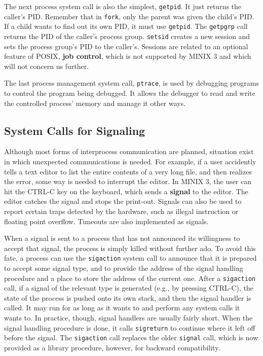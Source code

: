 \documentclass{book}
\newcommand {\kw}  [1] {\textbf{#1}}
\newcommand {\cmd} [1] {\texttt{#1}}
\begin{document}
The next process system call is also the simplest, \cmd{getpid}.
It just returns the caller's PID.
Remember that in \cmd{fork}, only the parent was given the child's PID.
If a child wants to find out its own PID, it must use \cmd{getpid}.
The \cmd{getpgrp} call returns the PID of the caller's process group.
\cmd{setsid} creates a new session and sets the process group's PID to the caller's.
Sessions are related to an optional feature of POSIX, \kw{job control}, which is not supported by MINIX 3 and which will not concern us further.

The last process management system call, \cmd{ptrace}, is used by debugging programs to control the program being debugged.
It allows the debugger to read and write the controlled process' memory and manage it other ways.

\subsection{System Calls for Signaling}
Although most forms of interprocess communication are planned, 
situation exist in which unexpected communications is needed.
For example, if a user accidently tells a text editor to list the entire contents of a very long file,
and then realizes the error, some way is needed to interrupt the editor.
In MINIX 3, the user can hit the CTRL-C key on the keyboard, which sends a \kw{signal} to the editor.
The editor catches the signal and stops the print-out.
Signals can also be used to report certain traps detected by the hardware, such as illegal instruction or floating point overflow.
Timeouts are also implemented as signals.

When a signal is sent to a process that has not announced its willingness to accept that signal,
the process is simply killed without further ado.
To avoid this fate, a process can use the \cmd{sigaction} system call to announce that it is prepared to accept some signal type,
and to provide the address of the signal handling procedure and a place to store the address of the current one.
After a \cmd{sigaction} call, if a signal of the relevant type is generated (e.g., by pressing CTRL-C), 
the state of the process is pushed onto its own stack, and then the signal handler is called.
It may run for as long as it wants to and perform any system calls it wants to.
In practice, though, signal handlers are usually fairly short.
When the signal handling procedure is done, it calls \cmd{sigreturn} to continue where it left off before the signal.
The \cmd{sigaction} call replaces the older \cmd{signal} call, which is now provided as a library procedure, 
however, for backward compatibility.
\end{document}
